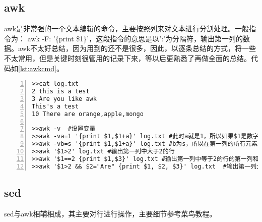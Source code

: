 \subsection{awk}
awk是非常强的一个文本编辑的命令，主要按照列来对文本进行分割处理。一般指令为： awk -F: '\{print \$1\}'，这段指令的意思是以':'为分隔符，输出第一列的数据。awk不太好总结，因为用到的还不是很多，因此，以逐条总结的方式，将一些不太常用，但是关键时刻很管用的记录下来，等以后更熟悉了再做全面的总结。代码如\ref{lst:awkcmd}。
\begin{lstlisting}[language = shell, numbers=left, label={lst:awkcmd},
     numberstyle=\tiny,keywordstyle=\color{blue!70}, caption={grep指令的一般性操作}
     commentstyle=\color{red!50!green!50!blue!50},frame=shadowbox,
     rulesepcolor=\color{red!20!green!20!blue!20},basicstyle=\ttfamily]
>>cat log.txt
2 this is a test
3 Are you like awk
This's a test
10 There are orange,apple,mongo

>>awk -v  #设置变量
>>awk -va=1 '{print $1,$1+a}' log.txt #此时a就是1，所以如果$1是数字，那么数字加一，如果不是，那么输出就是1
>>awk -vb=s '{print $1,$1+a}' log.txt #b为s，所以在第一列的所有元素后面加个s
>>awk '$1>2' log.txt #输出第一列中大于2的行
>>awk '$1==2 {print $1,$3}' log.txt #输出第一列中等于2的行的第一列和第三列
>>awk '$1>2 && $2="Are" {print $1, $2, $3}' log.txt  #输出第一列大于2的行的第一、二和三列
\end{lstlisting}
\subsection{sed}
sed与awk相辅相成，其主要对行进行操作，主要细节参考菜鸟教程。


